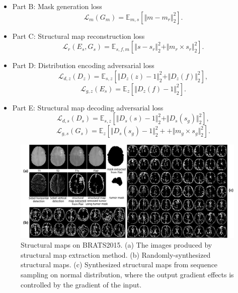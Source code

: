 \documentclass[runningheads]{llncs}
\begin{document}
	\begin{itemize}
		\item{Part B: Mask generation loss}
		\begin{equation}
		\mathcal{L}_{m}(G_m)=\mathbb{E}_{m,s}[\Vert{m-m_r}\Vert_{2}^{2}].
		\end{equation}
		\item{Part C: Structural map reconstruction loss} 
		\begin{equation}
		\mathcal{L}_{r}(E_s,G_s)=\mathbb{E}_{s,f,m}[\Vert{s-s_r}\Vert_{2}^{2}+\Vert{m_r\times s_r}\Vert_{2}^{2}].
		\end{equation}
		\item{Part D: Distribution encoding adversarial loss} 
		\begin{equation}
		\mathcal{L}_{d,z}(D_{z})=\mathbb{E}_{s,z}[\Vert{D_{z}(z)-1}\Vert_{2}^{2}+\Vert{D_{z}(f)}\Vert_{2}^{2}],
		\end{equation}
		\begin{equation}
		\mathcal{L}_{g,z}(E_s)=\mathbb{E}_{z}[\Vert{D_{z}(f)-1}\Vert_{2}^{2}].	
		\end{equation}
		\item{Part E: Structural map decoding adversarial loss} 
		\begin{equation}
		\mathcal{L}_{d,s}(D_{s})=\mathbb{E}_{s,z}[\Vert{D_{s}(s)-1}\Vert_{2}^{2}+\Vert{D_{s}(s_g)}\Vert_{2}^{2}],
		\end{equation}
		\begin{equation}
		\mathcal{L}_{g,s}(G_s)=\mathbb{E}_{z}[\Vert{D_{s}(s_g)-1}\Vert_{2}^{2}++\Vert{m_g\times s_g}\Vert_{2}^{2}].	
		\end{equation}
	\end{itemize}
	\begin{figure}[th]
		\centering
		\includegraphics[width=1\linewidth]{figures/brats_f}
		\caption{Structural maps on BRATS2015. (a) The images produced by structural map extraction method. (b) Randomly-synthesized structural maps. (c) Synthesized structural maps from sequence sampling on normal distribution, where the output gradient effects is controlled by the gradient of the input. }
		\label{generated_f}
	\end{figure}
\end{document}

